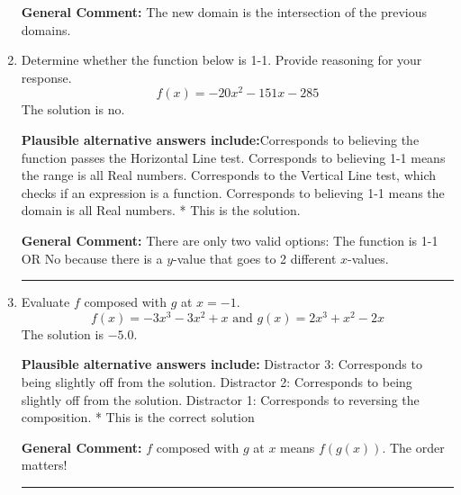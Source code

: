 \documentclass{extbook}[14pt]
\newcommand{\litem}[1]{\item #1

\rule{\textwidth}{0.4pt}}
\begin{document}
\begin{enumerate}
{\begin{enumerate}[label=\Alph*.]
\end{enumerate}

\textbf{General Comment:} The new domain is the intersection of the previous domains.
}
\litem{
Determine whether the function below is 1-1. Provide reasoning for your response.
\[ f(x) = -20 x^2 - 151 x - 285 \]The solution is \( \text{no} \).\begin{enumerate}[label=\Alph*.]
\textbf{Plausible alternative answers include:}Corresponds to believing the function passes the Horizontal Line test.
Corresponds to believing 1-1 means the range is all Real numbers.
Corresponds to the Vertical Line test, which checks if an expression is a function.
Corresponds to believing 1-1 means the domain is all Real numbers.
* This is the solution.
\end{enumerate}

\textbf{General Comment:} There are only two valid options: The function is 1-1 OR No because there is a $y$-value that goes to 2 different $x$-values.
}
\litem{
Evaluate $f$ composed with $g$ at $x=-1$.
\[ f(x) = -3x^{3} -3 x^{2} +x \text{ and } g(x) = 2x^{3} + x^{2} -2 x \]The solution is \( -5.0 \).\begin{enumerate}[label=\Alph*.]
\textbf{Plausible alternative answers include:} Distractor 3: Corresponds to being slightly off from the solution.
 Distractor 2: Corresponds to being slightly off from the solution.
 Distractor 1: Corresponds to reversing the composition.
* This is the correct solution

\end{enumerate}

\textbf{General Comment:} $f$ composed with $g$ at $x$ means $f(g(x))$. The order matters!
}
\end{enumerate}
\end{document}
